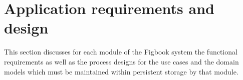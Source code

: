 \documentclass[12pt]{article}
\begin{document}
\section{Application requirements and design}
\par{This section discusses for each module of the Figbook system the functional requirements
as well as the process designs for the use cases and the domain models which must be maintained
within persistent storage by that module.
}


\newpage


\newpage


\newpage


\newpage


\newpage


\newpage
\end{document}
